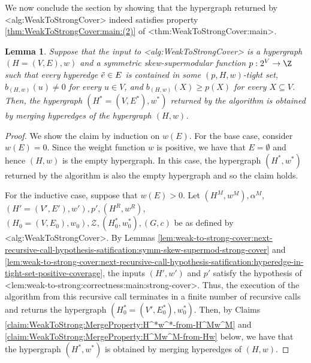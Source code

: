 \documentclass{article}
\def\Cref#1{<#1>}%
\newtheorem{lemma}{Lemma}[section]
\newcommand{\zeros}{\ensuremath{\mathcal{Z}}\xspace}
\begin{document}
We now conclude the section by showing that the hypergraph returned by \Cref{alg:WeakToStrongCover} indeed satisfies property \ref{thm:WeakToStrongCover:main:(2)} of \Cref{thm:WeakToStrongCover:main}.

\begin{lemma}\label{lem:weak-to-strong:correctness:main:hyperedge-merge}
    Suppose that the input to \Cref{alg:WeakToStrongCover} is a hypergraph $(H = (V, E), w)$ and a symmetric skew-supermodular function $p:2^V\rightarrow \Z$ %
such that every hyperedge $\Tilde{e} \in E$ is contained in some $(p, H, w)$-tight set, $b_{(H,w)}(u) \not = 0$ for every $u \in V$, and $b_{(H,w)}(X) \geq p(X)$ for every $X \subseteq V$. 
    Then, the hypergraph $(H^* = (V, E^*), w^*)$ returned by the algorithm is obtained by merging hyperedges of the hypergraph $(H, w)$.
\end{lemma}
\begin{proof}
     We show the claim by induction on $w(E)$. For the base case, consider $w(E) = 0$. Since the weight function $w$ is positive, we have that $E = \emptyset$ and hence $(H, w)$ is the empty hypergraph. In this case, the hypergraph $(H^*, w^*)$ returned by the algorithm is also the empty hypergraph and so the claim holds. 

    For the inductive case, suppose that $w(E) > 0$. Let $(H^M, w^M), \alpha^M$, $(H' = (V', E'), w'), p',(H^R, w^R)$, $(H_0 = (V, E_0), w_0), \zeros, (H^*_0, w^*_0), (G, c)$ be as defined by \Cref{alg:WeakToStrongCover}. By Lemmas \ref{lem:weak-to-strong-cover:next-recursive-call-hypothesis-satification:symm-skew-supermod-strong-cover} and \ref{lem:weak-to-strong-cover:next-recursive-call-hypothesis-satification:hyperedge-in-tight-set-positive-coverage}, the inputs $(H',w')$ and $p'$ satisfy the hypothesis of \Cref{lem:weak-to-strong:correctness:main:strong-cover}. 
    Thus, the execution of the algorithm from this recursive call terminates in a finite number of recursive calls and returns the hypergraph $(H_0^* = (V', E_0^*), w_0^*)$. 
    Then, by Claims \ref{claim:WeakToStrong:MergeProperty:H^*w^*-from-H^Mw^M} and \ref{claim:WeakToStrong:MergeProperty:H^Mw^M-from-Hw} below, we have that the hypergraph $(H^*, w^*)$ is obtained by merging hyperedges of $(H, w)$.
    \end{proof}
\end{document}
